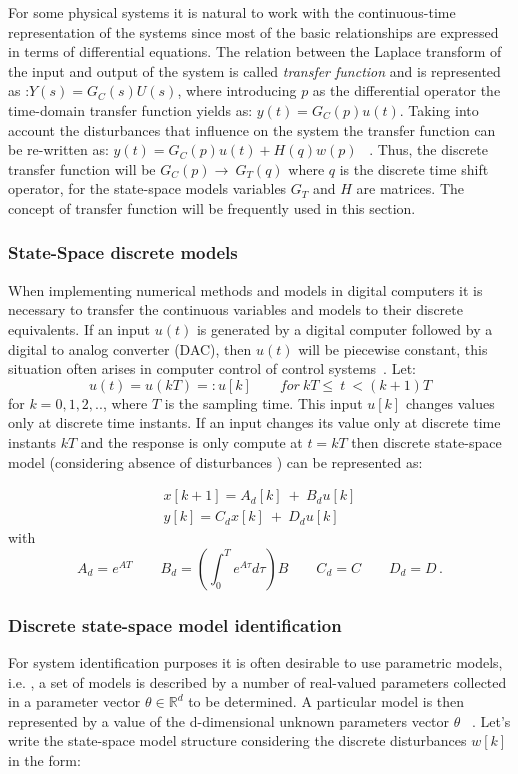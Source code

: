 For some physical systems it is natural to work with the continuous-time representation of the systems since most of the basic relationships are expressed in terms of differential equations. The relation between the Laplace transform of the input and output of the system  is called \textit{transfer function} and is represented as :$Y(s)=G_C(s)U(s)$, where introducing $p$ as the differential operator the time-domain transfer function yields as:  $y(t)=G_C(p)u(t)$. Taking into account the disturbances that influence on the system the transfer function can be re-written as: $y(t)=G_C(p)u(t)+H(q)w(p)$ ~\cite[Chapter~2]{Ljung1987}. Thus, the discrete transfer function will be $G_C(p) \rightarrow ~G_T(q)$  where $q$ is the discrete time shift operator, for the state-space models variables $G_T$ and $H$ are matrices. The concept of transfer function will be frequently used in this section.
\smallskip


\subsubsection{State-Space discrete models}
When implementing numerical methods and models in digital computers it is necessary to transfer the continuous variables and models to their discrete equivalents. If an input $u(t)$ is generated by a digital computer followed by a digital to analog converter (DAC), then $u(t)$ will be piecewise constant, this situation often arises in computer control of control systems~\cite[Chapter~4]{Chen1999}. Let:
\begin{equation}
u(t)=u(kT)=:u[k] \qquad for\: kT\leq~t~<(k+1)T
\end{equation}
for $k=0,1,2,..$, where $T$ is the sampling time. This input $u[k]$ changes values only at discrete time instants. If an input changes its value only at discrete time instants $kT$ and the response is only compute at $t=kT$ then discrete state-space model (considering absence of disturbances ) can be represented as:


 \begin{align}
x[k+1]=A_d[k]~+~B_du[k]\\
y[k]=C_dx[k]~+~D_du[k]
\label{SS_dscrt}
\end{align}
with
\begin{equation}
A_d=e^{AT}\qquad B_d=\left(\int_{0}^{T} e^{A\tau}d\tau\right)B \qquad C_d=C \qquad D_d=D \, .
\end{equation}



\subsubsection{Discrete state-space model identification}
\label{Disc_SS_ident}
For system identification purposes it is often desirable to use parametric models, i.e. , a set of models is described by a number of real-valued parameters collected in a parameter  vector $\theta\in \mathbb{R}^d$ to be determined. A particular model is then represented by a value of the d-dimensional unknown parameters vector $\theta$ ~\cite[Chapter~2]{McKelvey1995}. Let's write the state-space model structure considering the discrete disturbances $w[k]$ in the form:

